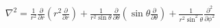 \documentclass[preview]{standalone}
\begin{document}
\begin{align*}
\nabla^2 = \frac{1}{r^2} \frac{\partial}{\partial r} \left( r^2 \frac{\partial}{\partial r} \right) + \frac{1}{r^2 \sin\theta} \frac{\partial}{\partial \theta} \left( \sin\theta \frac{\partial}{\partial \theta} \right) + \frac{1}{r^2 \sin^2\theta} \frac{\partial^2}{\partial \phi^2}
\end{align*}
\end{document}
